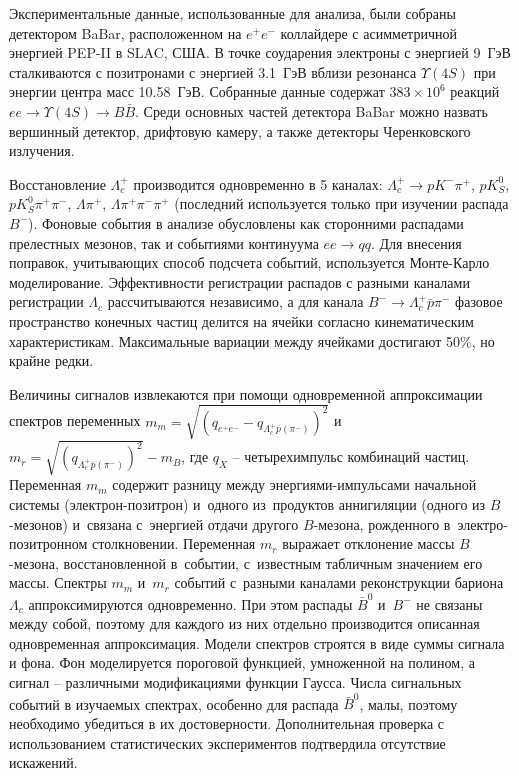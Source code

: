 \documentclass[a4paper, 12pt]{article}
\begin{document}
Экспериментальные данные, использованные для анализа, были собраны 
детектором BaBar, расположенном на $e^+e^-$ коллайдере с асимметричной 
энергией PEP-II в SLAC, США. В точке соударения электроны с энергией 
9~ГэВ сталкиваются с позитронами с энергией 3.1~ГэВ вблизи резонанса 
$\Upsilon(4S)$ при энергии центра масс 10.58~ГэВ. Собранные данные 
содержат $383\times10^6$ реакций $ee\to \Upsilon(4S) \to B\bar{B}$.
%
Среди основных частей детектора BaBar можно назвать вершинный детектор, 
дрифтовую камеру, а также детекторы Черенковского излучения.

Восстановление $\Lambda_c^+$ производится одновременно в 5 каналах:
$\Lambda_c^+ \to p K^- \pi^+$, $pK^0_S$, $pK^0_S\pi^+\pi^-$,
$\Lambda\pi^+$, $\Lambda\pi^+\pi^-\pi^+$ (последний используется только 
при изучении распада $B^-$). Фоновые события в анализе обусловлены как 
сторонними распадами прелестных мезонов, так и событиями континуума 
$ee\to qq$. Для внесения поправок, учитывающих способ подсчета событий, 
используется Монте-Карло моделирование. Эффективности регистрации 
распадов с разными каналами регистрации $\Lambda_c$ рассчитываются 
независимо, а для канала $B^-\to\Lambda_c^+\bar{p}\pi^-$ фазовое 
пространство конечных частиц делится на ячейки согласно кинематическим 
характеристикам. Максимальные вариации между ячейками достигают 50\%, но 
крайне редки.


Величины сигналов извлекаются при помощи одновременной аппроксимации 
спектров переменных
$m_m = \sqrt{\left(q_{e^+e^-} - q_{\Lambda_c^+\bar{p}(\pi^-)}\right)^2}$
и $m_r = \sqrt{\left(q_{\Lambda_c^+\bar{p}(\pi^-)}\right)^2} - m_B$,
где $q_X$ -- четырехимпульс комбинаций частиц. Переменная $m_m$ содержит 
разницу между энергиями-импульсами начальной системы (электрон-позитрон) 
и~одного из~продуктов аннигиляции (одного из {$B$-мезонов}) и~связана 
с~энергией отдачи другого $B$-мезона, рожденного в~электро-позитронном 
столкновении. Переменная $m_r$ выражает отклонение массы $B$-мезона, 
восстановленной в~событии, с~известным табличным значением его массы. 
Спектры $m_m$ и~$m_r$ событий с~разными каналами реконструкции бариона 
$\Lambda_c$ аппроксимируются одновременно. При этом распады $\bar{B}^0$ 
и~$B^-$ не связаны между собой, поэтому для каждого из них отдельно 
производится описанная одновременная аппроксимация.
%
Модели спектров строятся в виде суммы сигнала и фона. Фон моделируется 
пороговой функцией, умноженной на полином, а сигнал -- различными 
модификациями функции Гаусса.
%
Числа сигнальных событий в изучаемых спектрах, особенно для распада 
$\bar{B}^0$, малы, поэтому необходимо убедиться в их достоверности. 
Дополнительная проверка с использованием статистических экспериментов 
подтвердила отсутствие искажений.
\end{document}
